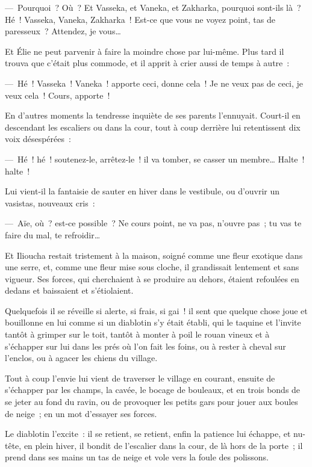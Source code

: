 \documentclass[french,twoside]{book} %
\begin{document}
— Pourquoi ? Où ? Et Vasseka, et Vaneka, et Zakharka, pourquoi sont-ils là ? Hé ! Vasseka, Vaneka, Zakharka ! Est-ce que vous ne voyez point, tas de paresseux ? Attendez, je vous…\par
Et Élie ne peut parvenir à faire la moindre chose par lui-même. Plus tard il trouva que c’était plus commode, et il apprit à crier aussi de temps à autre :\par
— Hé ! Vasseka ! Vaneka ! apporte ceci, donne cela ! Je ne veux pas de ceci, je veux cela ! Cours, apporte !\par
En d’autres moments la tendresse inquiète de ses parents l’ennuyait. Court-il en descendant les escaliers ou dans la cour, tout à coup derrière lui retentissent dix voix désespérées :\par
— Hé ! hé ! soutenez-le, arrêtez-le ! il va tomber, se casser un membre… Halte ! halte !\par
Lui vient-il la fantaisie de sauter en hiver dans le vestibule, ou d’ouvrir un vasistas, nouveaux cris :\par
— Aïe, où ? est-ce possible ? Ne cours point, ne va pas, n’ouvre pas ; tu vas te faire du mal, te refroidir…\par
Et Ilioucha restait tristement à la maison, soigné comme une fleur exotique dans une serre, et, comme une fleur mise sous cloche, il grandissait lentement et sans vigueur. Ses forces, qui cherchaient à se produire au dehors, étaient refoulées en dedans et baissaient et s’étiolaient.\par
Quelquefois il se réveille si alerte, si frais, si gai ! il sent que quelque chose joue et bouillonne en lui comme si un diablotin s’y était établi, qui le taquine et l’invite tantôt à grimper sur le toit, tantôt à monter à poil le rouan vineux et à s’échapper sur lui dans les prés où l’on fait les foins, ou à rester à cheval sur l’enclos, ou à agacer les chiens du village.\par
Tout à coup l’envie lui vient de traverser le village en courant, ensuite de s’échapper par les champs, la cavée, le bocage de bouleaux, et en trois bonds de se jeter au fond du ravin, ou de provoquer les petits gars pour jouer aux boules de neige ; en un mot d’essayer ses forces.\par
Le diablotin l’excite : il se retient, se retient, enfin la patience lui échappe, et nu-tête, en plein hiver, il bondit de l’escalier dans la cour, de là hors de la porte ; il prend dans ses mains un tas de neige et vole vers la foule des polissons.\par
\end{document}
